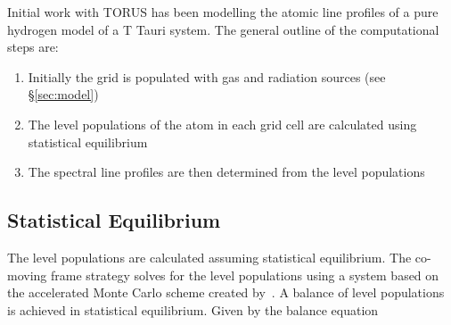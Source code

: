 \documentclass[fleqn,usenatbib]{mnras}
\begin{document}
Initial work with TORUS has been modelling the atomic line profiles of a pure hydrogen model of a T Tauri system. The general outline of the computational steps are:
\begin{enumerate}
    \item Initially the grid is populated with gas and radiation sources (see \S\ref{sec:model})
    \item The level populations of the atom in each grid cell are calculated using statistical equilibrium 
    \item The spectral line profiles are then determined from the level populations
\end{enumerate}


\subsection{Statistical Equilibrium}
\label{sec:statistical}

The level populations are calculated assuming statistical equilibrium. The co-moving frame strategy solves for the level populations using a system based on the accelerated Monte Carlo scheme created by~\citet{Hogerheijde:2000wb}. A balance of level populations is achieved in statistical equilibrium. Given by the balance equation
\end{document}
